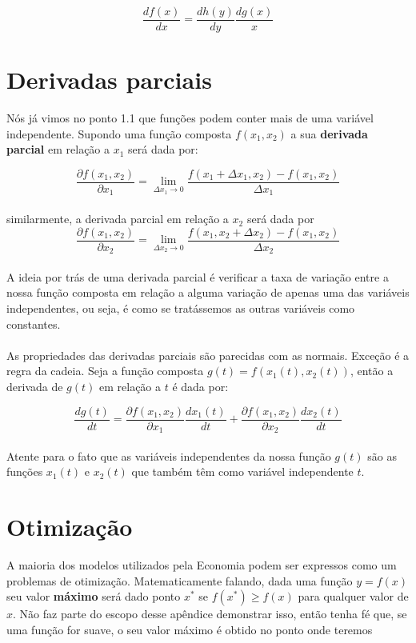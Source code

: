 \documentclass[a4paper,11pt,oneside]{book}
\theoremstyle{definition}
\theoremstyle{break}
\begin{document}
$$ \frac{df(x)}{dx} = \frac{dh(y)}{dy}\frac{dg(x)}{x}$$

\section{Derivadas parciais}

Nós já vimos no ponto 1.1 que funções podem conter mais de uma variável independente. Supondo uma função composta $f(x_1,x_2)$ a sua \textbf{derivada parcial} em relação a $x_1$ será dada por:

$$ \frac{\partial f(x_1,x_2)}{\partial x_1} = 
\lim_{\Delta x_1 \to 0} \frac{f(x_1+\Delta x_1,x_2) - f(x_1,x_2)}{\Delta x_1} $$
\\
similarmente, a derivada parcial em relação a $x_2$ será dada por
\\
$$ \frac{\partial f(x_1,x_2)}{\partial x_2} = 
\lim_{\Delta x_2 \to 0} \frac{f(x_1,x_2+\Delta x_2) - f(x_1,x_2)}{\Delta x_2} $$
\\
A ideia por trás de uma derivada parcial é verificar a taxa de variação entre a nossa função composta em relação a alguma variação de apenas uma das variáveis independentes, ou seja, é como se tratássemos as outras variáveis como constantes.
\\
\\
As propriedades das derivadas parciais são parecidas com as normais. Exceção é a regra da cadeia. Seja a função composta $g(t) = f(x_1(t),x_2(t))$, então a derivada de $g(t)$ em relação a $t$ é dada por:

$$ \frac{dg(t)}{dt} = 
\frac{\partial f(x_1,x_2)}{\partial x_1}\frac{dx_1(t)}{dt} + 
\frac{\partial f(x_1,x_2)}{\partial x_2}\frac{dx_2(t)}{dt} $$
\\
Atente para o fato que as variáveis independentes da nossa função $g(t)$ são as funções $x_1(t)$ e $x_2(t)$ que também têm como variável independente $t$.

\section{Otimização}

A maioria dos modelos utilizados pela Economia podem ser expressos como um problemas de otimização. Matematicamente falando, dada uma função $y = f(x)$ seu valor \textbf{máximo} será dado ponto $x^*$ se $f(x^*) \geqslant f(x)$ para qualquer valor de $x$. Não faz parte do escopo desse apêndice demonstrar isso, então tenha fé que, se uma função for suave, o seu valor máximo é obtido no ponto onde teremos
\end{document}
